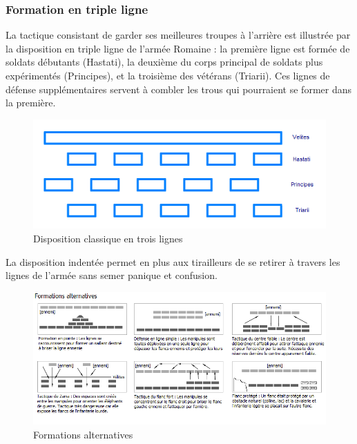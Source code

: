 \documentclass{article}
\begin{document}
\subsubsection{Formation en triple ligne}
La tactique consistant de garder ses meilleures troupes à l'arrière est illustrée par la disposition en triple ligne de l'armée Romaine : la première ligne est formée de soldats débutants (Hastati), la deuxième du corps principal de soldats plus expérimentés (Principes), et la troisième des vétérans (Triarii). Ces lignes de défense supplémentaires servent à combler les trous qui pourraient se former dans la première. 
\begin{figure}[H]
	\begin{centering}
	\includegraphics[width=\linewidth]{../ressources/Polybian_formation}
	\caption{Disposition classique en trois lignes \cite{roman_infantry_tactics}}
	\end{centering}
\end{figure}
La disposition indentée permet en plus aux tirailleurs de se retirer à travers les lignes de l'armée sans semer panique et confusion. 
\begin{figure}[H]
	\begin{centering}
	\includegraphics[width=\linewidth]{../ressources/Formations_infanterie_romaine}
	\caption{Formations alternatives \cite{roman_infantry_tactics}}
	\end{centering}
\end{figure}
\end{document}
